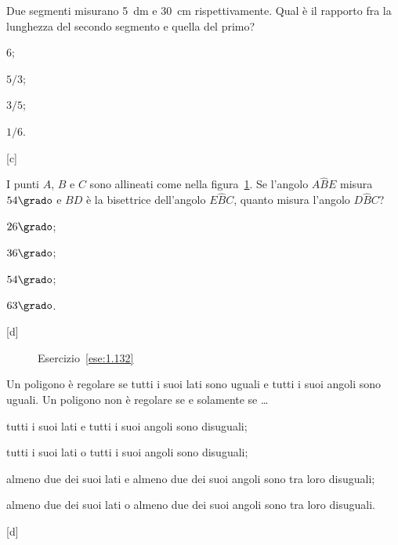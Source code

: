 \begin{esercizio}
\label{ese:1.131}
Due segmenti misurano 5~dm e 30~cm rispettivamente. Qual è il 
rapporto fra la lunghezza del secondo segmento e quella del primo?
\begin{multicols}{4}
\begin{enumeratea}
\item 6;
\item $5/3$;
\item $3/5$;
\item $1/6$.
\end{enumeratea}
\end{multicols}
\hfill[c]
\end{esercizio}

\begin{esercizio}
\label{ese:1.132}
I punti $A$, $B$ e $C$ sono allineati come nella 
figura~\ref{fig:ese1.132}. Se l'angolo $A\widehat{B}E$ misura 
$54\grado$ e $BD$ è la bisettrice dell'angolo $E\widehat{B}C$, quanto 
misura l'angolo $D\widehat{B}C$?
\begin{multicols}{4}
\begin{enumeratea}
\item $26\grado$;
\item $36\grado$;
\item $54\grado$;
\item $63\grado$.
\end{enumeratea}
\end{multicols}
\hfill[d]
\end{esercizio}

\begin{inaccessibleblock}
 \begin{figure}[htb]
 \centering
 \caption{Esercizio~\ref{ese:1.132}}\label{fig:ese1.132}
\end{figure}
\end{inaccessibleblock}


\begin{esercizio}
\label{ese:1.133}
Un poligono è regolare se tutti i suoi lati sono uguali e tutti i 
suoi angoli sono uguali. Un poligono non è regolare se e solamente se 
\ldots
\begin{enumeratea}
\item tutti i suoi lati e tutti i suoi angoli sono disuguali;
\item tutti i suoi lati o tutti i suoi angoli sono disuguali;
\item almeno due dei suoi lati e almeno due dei suoi angoli sono tra 
loro disuguali;
\item almeno due dei suoi lati o almeno due dei suoi angoli sono tra 
loro disuguali.
\end{enumeratea}
\hfill[d]
\end{esercizio}
